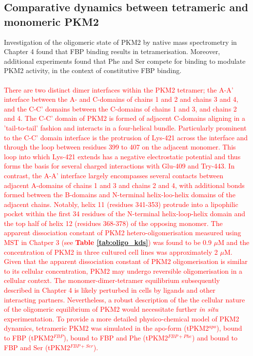 \subsection{Comparative dynamics between tetrameric and monomeric PKM2}
\label{subsec:tet_bdomain_closure}
Investigation of the oligomeric state of PKM2 by native mass spectrometry in Chapter 4 found that FBP binding results in tetramerisation. Moreover, additional experiments found that Phe and Ser compete for binding to modulate PKM2 activity, in the context of constitutive FBP binding.  
%
%
\\\\
%
%
\textcolor{red}{There are two distinct dimer interfaces within the PKM2 tetramer; the A-A' interface between the A- and C-domains of chains 1 and 2 and chains 3 and 4, and the C-C' domains between the C-domains of chains 1 and 3, and chains 2 and 4. The C-C' domain of PKM2 is formed of adjacent C-domains aligning in a 'tail-to-tail' fashion and interacts in a four-helical bundle. Particularly prominent to the C-C' domain interface is the protrusion of Lys-421 across the interface and through the loop between residues 399 to 407 on the adjacent monomer. This loop into which Lys-421 extends has a negative electrostatic potential and thus forms the basis for several charged interactions with Glu-409 and Try-443. In contrast, the A-A' interface largely encompasses several contacts between adjacent A-domains of chains 1 and 3 and chains 2 and 4, with additional bonds formed between the B-domains and N-terminal helix-loo-helix domains of the adjacent chains. Notably, helix 11 (residues 341-353) protrude into a lipophilic pocket within the first 34 residues of the N-terminal helix-loop-helix domain and the top half of helix 12 (residues 368-378) of the opposing monomer. The apparent dissociation constant of PKM2 hetero-oligomerisation measured using MST in Chatper 3 (see \textbf{Table \ref{tab:oligo_kds}}) was found to be 0.9 $\mu$M and the concentration of PKM2 in three cultured cell lines was approximately 2 $\mu$M. Given that the apparent dissociation constant of PKM2 oligomerisation is similar to its cellular concentration, PKM2 may undergo reversible oligomerisation in a cellular context. The monomer-dimer-tetramer equilibrium subsequently described in Chapter 4 is likely perturbed in cells by ligands and other interacting partners. Nevertheless, a robust description of the the cellular nature of the oligomeric equilibrium of PKM2 would necessitate further \textit{in situ} experimentation. To provide a more detailed physico-chemical model of PKM2 dynamics, tetrameric PKM2 was simulated in the apo-form (tPKM2$^{apo}$), bound to FBP (tPKM2$^{FBP}$), bound to FBP and Phe (tPKM2$^{FBP+Phe}$) and bound to FBP and Ser (tPKM2$^{FBP+Ser}$).} 

